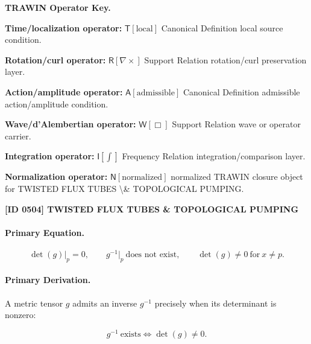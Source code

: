 \par\vspace{0.45\baselineskip}
\noindent\begin{minipage}[t]{\linewidth}
\begingroup
\small
\raggedright
\textbf{TRAWIN Operator Key.}\par
\noindent\textbf{Time/localization operator:} $\mathsf{T}\!\left[\mathrm{local}\right]$ Canonical Definition local source condition.\par
\noindent\textbf{Rotation/curl operator:} $\mathsf{R}\!\left[\nabla\times\right]$ Support Relation rotation/curl preservation layer.\par
\noindent\textbf{Action/amplitude operator:} $\mathsf{A}\!\left[\mathrm{admissible}\right]$ Canonical Definition admissible action/amplitude condition.\par
\noindent\textbf{Wave/d'Alembertian operator:} $\mathsf{W}\!\left[\Box\right]$ Support Relation wave or operator carrier.\par
\noindent\textbf{Integration operator:} $\mathsf{I}\!\left[\int\right]$ Frequency Relation integration/comparison layer.\par
\noindent\textbf{Normalization operator:} $\mathsf{N}\!\left[\mathrm{normalized}\right]$ normalized TRAWIN closure object for TWISTED FLUX TUBES \textbackslash{}\& TOPOLOGICAL PUMPING.\par
\endgroup
\end{minipage}

\clearpage
\noindent\textbf{[ID 0504] TWISTED FLUX TUBES \& TOPOLOGICAL PUMPING}\par
\vspace{0.35em}
\paragraph{Primary Equation.}
\begin{equation}
\det(g)\big|_{p}=0,
\qquad
g^{-1}\big|_{p}\ \text{does not exist},
\qquad
\det(g)\neq 0\ \text{for}\ x\neq p .
\end{equation}

\paragraph{Primary Derivation.}
A metric tensor $g$ admits an inverse $g^{-1}$ precisely when its determinant is nonzero:

\begin{equation}
g^{-1}\ \text{exists}
\iff
\det(g)\neq 0 .
\end{equation}

